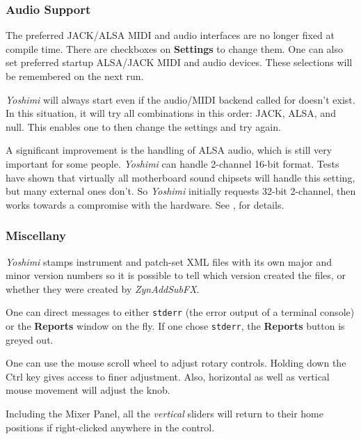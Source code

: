 \documentclass[
 11pt,
 twoside,
 a4paper,
 final                                 %
]{article}
\begin{document}
\subsubsection{Audio Support}
\label{subsubsec:new_features_audio_support}

   The preferred JACK/ALSA MIDI and audio interfaces are no longer fixed at
   compile time. There are checkboxes on \textbf{Settings} to change them.
   One can also set preferred startup ALSA/JACK MIDI and audio devices.
   These selections will be remembered on the next run.

   \textsl{Yoshimi} will always start even if the audio/MIDI backend called
   for doesn't exist. In this situation, it will try all combinations in this
   order: JACK, ALSA, and null. This enables one to then change the settings
   and try again.

   A significant improvement is the handling of ALSA audio, which is still very
   important for some people.  \textsl{Yoshimi} can handle 2-channel 16-bit
   format. Tests have shown that virtually all motherboard sound chipsets will
   handle this setting, but many external ones don't.  So \textsl{Yoshimi}
   initially requests 32-bit 2-channel, then works towards a compromise with the
   hardware.
   See , for details.

\subsubsection{Miscellany}
\label{subsubsec:new_features_miscellany}

   \textsl{Yoshimi} stamps instrument and patch-set XML files with its own
   major and minor version numbers so it is possible to tell which version
   created the files, or whether they were created by \textsl{ZynAddSubFX}.

   One can direct messages to either \texttt{stderr}
   (the error output of a terminal console) or the \textbf{Reports} window
   on the fly. If one chose \texttt{stderr}, the \textbf{Reports} button is
   greyed out.

   One can use the mouse scroll wheel to adjust rotary controls. Holding
   down the Ctrl key gives access to finer adjustment.  Also, horizontal as
   well as vertical mouse movement will adjust the knob.

   Including the Mixer Panel, all the \textsl{vertical} sliders will return to
   their home positions if right-clicked anywhere in the control.
\end{document}
